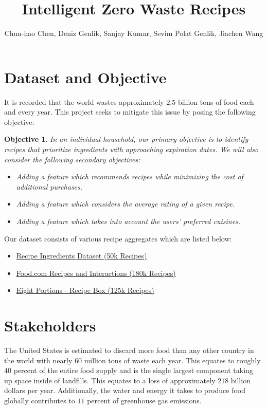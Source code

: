 \documentclass{article}
\newtheorem*{objective}{Objective}
\begin{document}
	

		\title{Intelligent Zero Waste Recipes}
		\author{Chun-hao Chen, Deniz Genlik, Sanjay Kumar, Sevim Polat Genlik, Jiachen Wang}
		\date{}
\maketitle
		

	
\section{Dataset and Objective}
It is recorded that the world wastes approximately $2.5$ billion tons of food each and every year. This project seeks to mitigate this issue by posing the following objective:
\begin{objective}
In an individual household, our primary objective is to identify recipes that prioritize ingredients with approaching expiration dates. We will also consider the following secondary objectives:
\begin{itemize}
\item Adding a feature which recommends recipes while minimizing the cost of additional purchases.
\item Adding  a feature which considers the average rating of a given recipe. 
\item Adding a feature which takes into account the users' preferred cuisines.
\end{itemize} 
\end{objective}
\noindent Our dataset consists of various recipe aggregates which are listed below:
\begin{itemize}
\item \href{https://www.kaggle.com/datasets/kaggle/recipe-ingredients-dataset}{Recipe Ingredients Dataset (50k Recipes)}

\item \href{https://www.kaggle.com/datasets/shuyangli94/food-com-recipes-and-user-interactions?select=PP_users.csv}{Food.com Recipes and Interactions (180k Recipes)}

\item \href{https://eightportions.com/datasets/Recipes/#fn:1}{Eight Portions - Recipe Box (125k Recipes)}
\end{itemize}
		
\section{Stakeholders}
The United States is estimated to discard more food than any other country in the world with nearly $60$ million tons of waste each year. This equates to roughly $40$ percent of the entire food supply and is the single largest component taking up space inside of landfills. This equates to a loss of approximately $218$ billion dollars per year. Additionally, the water and energy it takes to produce food globally contributes to $11$ percent of greenhouse gas emissions. 
\end{document}

